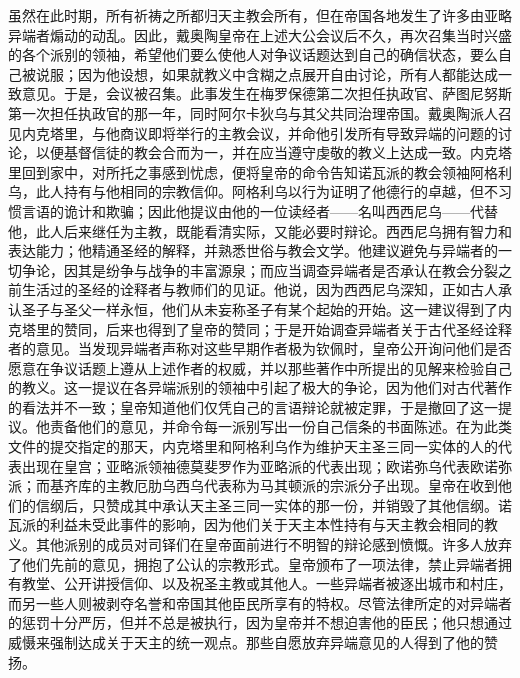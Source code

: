 虽然在此时期，所有祈祷之所都归天主教会所有，但在帝国各地发生了许多由亚略异端者煽动的动乱。因此，戴奥陶皇帝在上述大公会议后不久，再次召集当时兴盛的各个派别的领袖，希望他们要么使他人对争议话题达到自己的确信状态，要么自己被说服；因为他设想，如果就教义中含糊之点展开自由讨论，所有人都能达成一致意见。于是，会议被召集。此事发生在梅罗保德第二次担任执政官、萨图尼努斯第一次担任执政官的那一年，同时阿尔卡狄乌与其父共同治理帝国。戴奥陶派人召见内克塔里，与他商议即将举行的主教会议，并命他引发所有导致异端的问题的讨论，以便基督信徒的教会合而为一，并在应当遵守虔敬的教义上达成一致。内克塔里回到家中，对所托之事感到忧虑，便将皇帝的命令告知诺瓦派的教会领袖阿格利乌，此人持有与他相同的宗教信仰。阿格利乌以行为证明了他德行的卓越，但不习惯言语的诡计和欺骗；因此他提议由他的一位读经者——名叫西西尼乌——代替他，此人后来继任为主教，既能看清实际，又能必要时辩论。西西尼乌拥有智力和表达能力；他精通圣经的解释，并熟悉世俗与教会文学。他建议避免与异端者的一切争论，因其是纷争与战争的丰富源泉；而应当调查异端者是否承认在教会分裂之前生活过的圣经的诠释者与教师们的见证。他说，因为西西尼乌深知，正如古人承认圣子与圣父一样永恒，他们从未妄称圣子有某个起始的开始。这一建议得到了内克塔里的赞同，后来也得到了皇帝的赞同；于是开始调查异端者关于古代圣经诠释者的意见。当发现异端者声称对这些早期作者极为钦佩时，皇帝公开询问他们是否愿意在争议话题上遵从上述作者的权威，并以那些著作中所提出的见解来检验自己的教义。这一提议在各异端派别的领袖中引起了极大的争论，因为他们对古代著作的看法并不一致；皇帝知道他们仅凭自己的言语辩论就被定罪，于是撤回了这一提议。他责备他们的意见，并命令每一派别写出一份自己信条的书面陈述。在为此类文件的提交指定的那天，内克塔里和阿格利乌作为维护天主圣三同一实体的人的代表出现在皇宫；亚略派领袖德莫斐罗作为亚略派的代表出现；欧诺弥乌代表欧诺弥派；而基齐库的主教厄肋乌西乌代表称为马其顿派的宗派分子出现。皇帝在收到他们的信纲后，只赞成其中承认天主圣三同一实体的那一份，并销毁了其他信纲。诺瓦派的利益未受此事件的影响，因为他们关于天主本性持有与天主教会相同的教义。其他派别的成员对司铎们在皇帝面前进行不明智的辩论感到愤慨。许多人放弃了他们先前的意见，拥抱了公认的宗教形式。皇帝颁布了一项法律，禁止异端者拥有教堂、公开讲授信仰、以及祝圣主教或其他人。一些异端者被逐出城市和村庄，而另一些人则被剥夺名誉和帝国其他臣民所享有的特权。尽管法律所定的对异端者的惩罚十分严厉，但并不总是被执行，因为皇帝并不想迫害他的臣民；他只想通过威慑来强制达成关于天主的统一观点。那些自愿放弃异端意见的人得到了他的赞扬。\par

